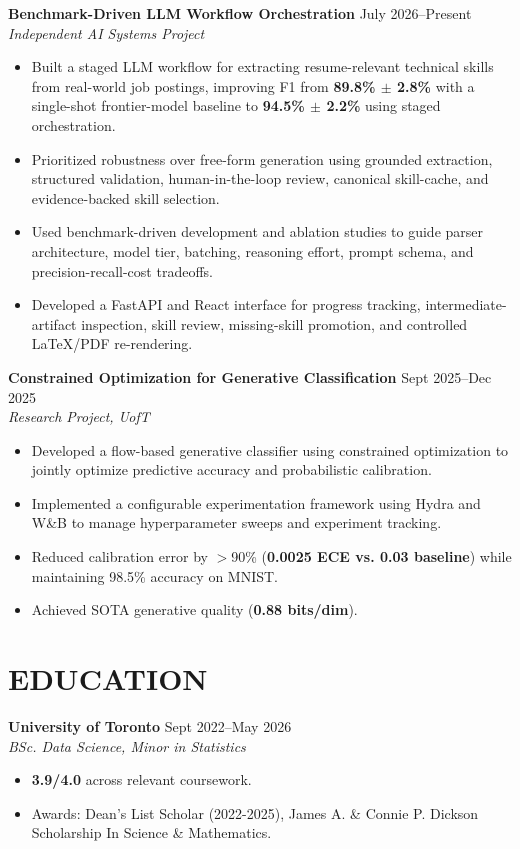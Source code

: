 \documentclass[10pt]{article}
\newenvironment{projectentry}[3]{%
    \noindent\textbf{#1} \hfill {\small #3}\\%
    \noindent\textit{#2}%
  \begin{itemize}
}{%
    \end{itemize}\par%
}
\begin{document}
\vspace{4pt}

\begin{projectentry}{Benchmark-Driven LLM Workflow Orchestration}{Independent AI Systems Project}{July 2026--Present}
\item Built a staged LLM workflow for extracting resume-relevant technical skills from real-world job postings, improving F1 from \textbf{89.8\% $\pm$ 2.8\%} with a single-shot frontier-model baseline to \textbf{94.5\% $\pm$ 2.2\%} using staged orchestration.
\item Prioritized robustness over free-form generation using grounded extraction, structured validation, human-in-the-loop review, canonical skill-cache, and evidence-backed skill selection.
\item Used benchmark-driven development and ablation studies to guide parser architecture, model tier, batching, reasoning effort, prompt schema, and precision-recall-cost tradeoffs.
\item Developed a FastAPI and React interface for progress tracking, intermediate-artifact inspection, skill review, missing-skill promotion, and controlled LaTeX/PDF re-rendering.
\end{projectentry}

\vspace{4pt}

\begin{projectentry}{Constrained Optimization for Generative Classification}{Research Project, UofT}{Sept 2025--Dec 2025}
\item Developed a flow-based generative classifier using constrained optimization to jointly optimize predictive accuracy and probabilistic calibration.
\item Implemented a configurable experimentation framework using Hydra and W\&B to manage hyperparameter sweeps and experiment tracking.
\item Reduced calibration error by \(>\)90\% (\textbf{0.0025 ECE vs. 0.03 baseline}) while maintaining 98.5\% accuracy on MNIST.
\item Achieved SOTA generative quality (\textbf{0.88 bits/dim}).
\end{projectentry}

\section*{EDUCATION}

\begin{projectentry}{University of Toronto}{BSc. Data Science, Minor in Statistics}{Sept 2022--May 2026}
\item \textbf{3.9/4.0} across relevant coursework.
\item Awards: Dean's List Scholar (2022-2025), James A. \& Connie P. Dickson Scholarship In Science \& Mathematics.
\end{projectentry}
\end{document}
